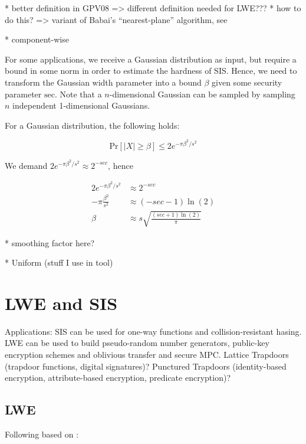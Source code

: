 \documentclass[
  a4paper,  %
  twoside,  %
  bibliography=totoc,
  headsepline,
  cleardoublepage=empty,
  parskip=half,
  draft=false
]{scrbook}
\begin{document}
    * better definition in GPV08 => different definition needed for LWE??? %
    * how to do this? => variant of Babai's ``nearest-plane'' algorithm, see \cite{GPV08} %

    * component-wise
    

    For some applications, we receive a Gaussian distribution as input, but require a bound in some norm in order to estimate the hardness of SIS. Hence, we need to transform the Gaussian width parameter into a bound $\beta$ given some security parameter $\text{sec}$. Note that a $n$-dimensional Gaussian can be sampled by sampling $n$ independent 1-dimensional Gaussians. %
        
    For a Gaussian distribution, the following holds: 
    
    \begin{equation}
      \text{Pr}\left[ |X| \geq \beta \right] \leq 2 e^{-\pi \beta^2/s^2}
    \end{equation}
    
    We demand $2 e^{-\pi \beta^2/s^2} \approx 2^{-sec}$, hence
    
    \begin{align*}
      2 e^{-\pi \beta^2/s^2} &\approx 2^{-sec}\\
      -\pi \frac{\beta^2}{s^2} &\approx (-sec - 1)\ln (2)\\
      \beta  &\approx s \sqrt{\frac{(sec + 1) \ln(2)}{\pi}}
    \end{align*}


    * smoothing factor here?

    * Uniform (stuff I use in tool)







\section{LWE and SIS}
Applications: SIS can be used for one-way functions and collision-resistant hasing. LWE can be used to build pseudo-random number generators, public-key encryption schemes and oblivious transfer and secure MPC. Lattice Trapdoors (trapdoor functions, digital signatures)? Punctured Trapdoors (identity-based encryption, attribute-based encryption, predicate encryption)? %

\subsection{LWE}
Following based on \cite{Reg10}:%
\end{document}

